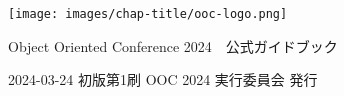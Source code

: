 \clearpage{\thispagestyle{empty}}
\begin{center}

\texttt{[image: images/chap-title/ooc-logo.png]}
\vspace{80pt}

\begin{sffamily}
\Large
Object Oriented Conference 2024　公式ガイドブック
\normalsize
\end{sffamily}
\vspace{80pt}

\begin{sffamily}
2024-03-24
\hspace{5pt}
初版第1刷
\hspace{5pt}
OOC 2024 実行委員会
\hspace{5pt}
発行
\end{sffamily}

\end{center}

\newpage
　

　
